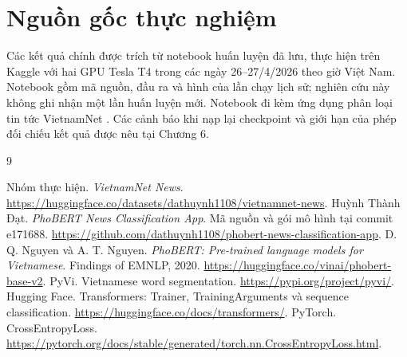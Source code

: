 \chapter{Nguồn gốc thực nghiệm}
Các kết quả chính được trích từ notebook huấn luyện đã lưu, thực hiện trên Kaggle với hai GPU Tesla T4 trong các ngày 26--27/4/2026 theo giờ Việt Nam. Notebook gồm mã nguồn, đầu ra và hình của lần chạy lịch sử; nghiên cứu này không ghi nhận một lần huấn luyện mới. Notebook đi kèm ứng dụng phân loại tin tức VietnamNet \cite{application}. Các cảnh báo khi nạp lại checkpoint và giới hạn của phép đối chiếu kết quả được nêu tại Chương 6.

\begin{thebibliography}{9}
 Nhóm thực hiện. \emph{VietnamNet News}. \url{https://huggingface.co/datasets/dathuynh1108/vietnamnet-news}.
 Huỳnh Thành Đạt. \emph{PhoBERT News Classification App}. Mã nguồn và gói mô hình tại commit e171688. \url{https://github.com/dathuynh1108/phobert-news-classification-app}.
 D. Q. Nguyen và A. T. Nguyen. \emph{PhoBERT: Pre-trained language models for Vietnamese}. Findings of EMNLP, 2020. \url{https://huggingface.co/vinai/phobert-base-v2}.
 PyVi. Vietnamese word segmentation. \url{https://pypi.org/project/pyvi/}.
 Hugging Face. Transformers: Trainer, TrainingArguments và sequence classification. \url{https://huggingface.co/docs/transformers/}.
 PyTorch. CrossEntropyLoss. \url{https://pytorch.org/docs/stable/generated/torch.nn.CrossEntropyLoss.html}.
\end{thebibliography}
